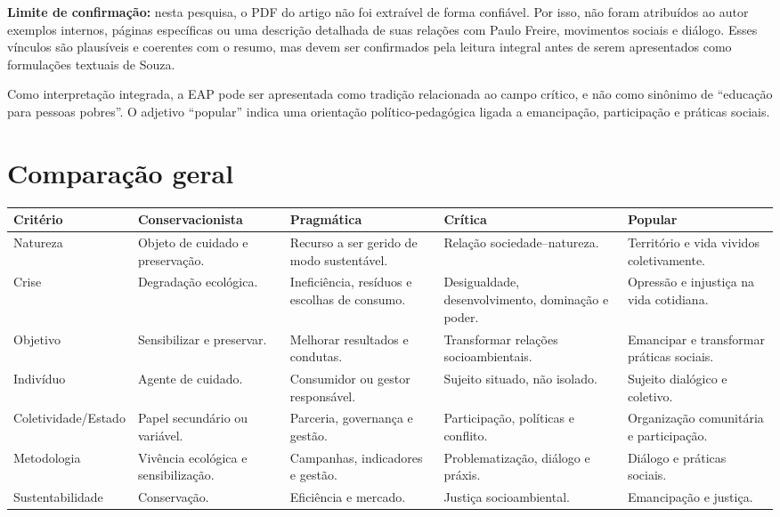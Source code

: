 \documentclass[12pt,a4paper]{article}
\begin{document}
\textbf{Limite de confirmação:} nesta pesquisa, o PDF do artigo não foi extraível de forma confiável. Por isso, não foram atribuídos ao autor exemplos internos, páginas específicas ou uma descrição detalhada de suas relações com Paulo Freire, movimentos sociais e diálogo. Esses vínculos são plausíveis e coerentes com o resumo, mas devem ser confirmados pela leitura integral antes de serem apresentados como formulações textuais de Souza.

Como interpretação integrada, a EAP pode ser apresentada como tradição relacionada ao campo crítico, e não como sinônimo de ``educação para pessoas pobres''. O adjetivo ``popular'' indica uma orientação político-pedagógica ligada a emancipação, participação e práticas sociais.

\section{Comparação geral}

\begin{longtable}{p{}p{}p{}p{}p{}}
\toprule
\textbf{Critério} & \textbf{Conservacionista} & \textbf{Pragmática} & \textbf{Crítica} & \textbf{Popular} \\
\midrule
\endhead
Natureza & Objeto de cuidado e preservação. & Recurso a ser gerido de modo sustentável. & Relação sociedade--natureza. & Território e vida vividos coletivamente\footnotemark. \\
Crise & Degradação ecológica. & Ineficiência, resíduos e escolhas de consumo. & Desigualdade, desenvolvimento, dominação e poder. & Opressão e injustiça na vida cotidiana\footnotemark[1]. \\
Objetivo & Sensibilizar e preservar. & Melhorar resultados e condutas. & Transformar relações socioambientais. & Emancipar e transformar práticas sociais\footnotemark[1]. \\
Indivíduo & Agente de cuidado. & Consumidor ou gestor responsável. & Sujeito situado, não isolado. & Sujeito dialógico e coletivo\footnotemark[1]. \\
Coletividade/Estado & Papel secundário ou variável. & Parceria, governança e gestão. & Participação, políticas e conflito. & Organização comunitária e participação\footnotemark[1]. \\
Metodologia & Vivência ecológica e sensibilização. & Campanhas, indicadores e gestão. & Problematização, diálogo e práxis. & Diálogo e práticas sociais\footnotemark[1]. \\
Sustentabilidade & Conservação. & Eficiência e mercado. & Justiça socioambiental. & Emancipação e justiça\footnotemark[1]. \\
\bottomrule
\end{longtable}
\end{document}
